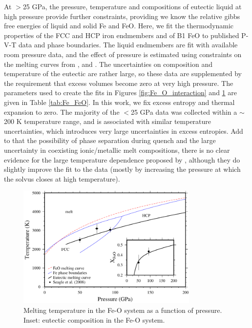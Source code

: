 \documentclass[review]{elsarticle}
\begin{document}
At $>$25 GPa, the pressure, temperature and compositions of eutectic liquid at high pressure \citep{SHCPW2008} provide further constraints, providing we know the relative gibbs free energies of liquid and solid Fe and FeO. Here, we fit the thermodynamic properties of the FCC and HCP iron endmembers and of B1 FeO to published P-V-T data and phase boundaries. The liquid endmembers are fit with available room pressure data, and the effect of pressure is estimated using constraints on the melting curves from \cite{ADMLM2013}, \cite{SHCPW2008} and \cite{OTHOH2011}. The uncertainties on composition and temperature of the eutectic are rather large, so these data are supplemented by the requirement that excess volumes become zero at very high pressure. The parameters used to create the fits in Figures \ref{fig:Fe_O_interaction} and \ref{fig:Fe_O_melting} are given in Table \ref{tab:Fe_FeO}. In this work, we fix excess entropy and thermal expansion to zero. The majority of the $<$25 GPa data was collected within a $\sim$200 K temperature range, and is associated with similar temperature uncertainties, which introduces very large uncertainties in excess entropies. Add to that the possibility of phase separation during quench and the large uncertainty in coexisting ionic/metallic melt compositions, there is no clear evidence for the large temperature dependence proposed by \cite{Frostetal2010}, although they do slightly improve the fit to the data (mostly by increasing the pressure at which the solvus closes at high temperature).

\begin{figure}[ht!]
  \centering
  \includegraphics[width=0.8\textwidth]{figures/Fe_FeO_T_X_eutectic}
  \caption{Melting temperature in the Fe-O system as a function of pressure. Inset: eutectic composition in the Fe-O system.}
  \label{fig:Fe_O_melting}
\end{figure}
\end{document}

